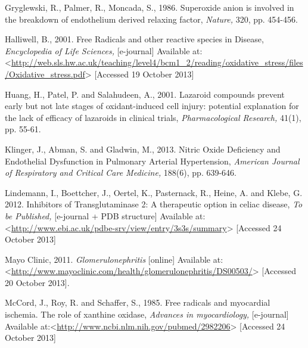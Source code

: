 \documentclass[11pt]{report}
\begin{document}
Gryglewski, R., Palmer, R., Moncada, S., 1986. Superoxide anion is involved in the break­down of endothelium derived relaxing factor, \textit{Nature,} 320, pp. 454-456.
\newline
\newline

Halliwell, B., 2001. Free Radicals and other reactive species in Disease, \textit{Encyclopedia of Life Sciences,} [e-journal] Available at:<\url{http://web.sls.hw.ac.uk/teaching/level4/bcm1_2/reading/oxidative_stress/files/Oxidative_stress.pdf}> [Accessed 19 October 2013]
\newline
\newline

Huang, H., Patel, P. and Salahudeen, A., 2001. Lazaroid compounds prevent early but not late stages of oxidant-induced cell injury: potential explanation for the lack of efficacy of lazaroids in clinical trials, \textit{Pharmacological Research,} 41(1), pp. 55-61.
\newline
\newline

Klinger, J., Abman, S. and Gladwin, M., 2013. Nitric Oxide Deficiency and Endothelial Dysfunction in Pulmonary Arterial Hypertension, \textit{American Journal of Respiratory and Critical Care Medicine,} 188(6), pp. 639-646.
\newline
\newline

Lindemann, I., Boettcher, J., Oertel, K., Pasternack, R., Heine, A. and Klebe, G. 2012. Inhibitors of Transglutaminase 2: A therapeutic option in celiac disease, \textit{To be Published,} [e-journal + PDB structure] Available at:<\url{http://www.ebi.ac.uk/pdbe-srv/view/entry/3s3s/summary}> [Accessed 24 October 2013]
\newline
\newline

Mayo Clinic, 2011. \textit{Glomerulonephritis} [online] Available at: <\url{http://www.mayoclinic.com/health/glomerulonephritis/DS00503/}> [Accessed 20 October 2013].
\newline
\newline

McCord, J., Roy, R. and Schaffer, S., 1985. Free radicals and myocardial ischemia. The role of xanthine oxidase, \textit{Advances in myocardiology,} [e-journal] Available at:<\url{http://www.ncbi.nlm.nih.gov/pubmed/2982206}> [Accessed 24 October 2013]
\newline
\newline
\end{document}
